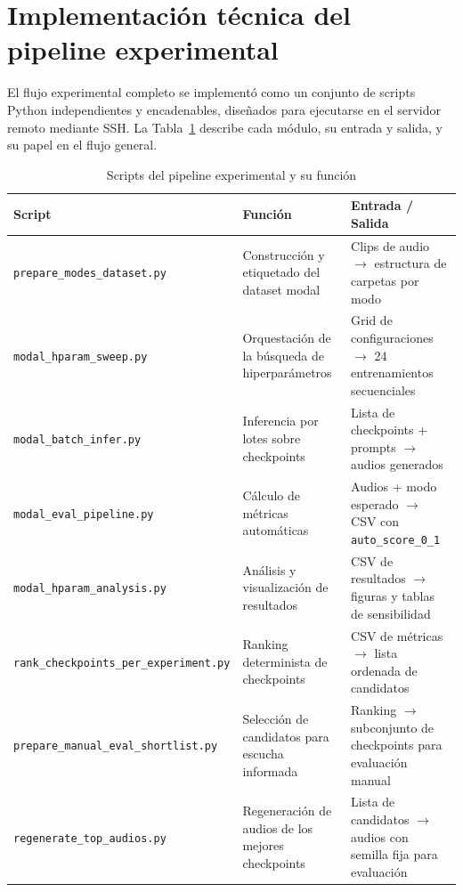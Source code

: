 \documentclass[%
    school=etsisi,%
    type=pfg,%
    degree=61CD,%
]{upm-report}
\begin{document}
\section{Implementaci\'on t\'ecnica del pipeline experimental}
\label{s:implementacion-pipeline}

El flujo experimental completo se implement\'o como un conjunto de scripts Python independientes y encadenables, dise\~nados para ejecutarse en el servidor remoto mediante SSH. La Tabla~\ref{tab:scripts-pipeline} describe cada m\'odulo, su entrada y salida, y su papel en el flujo general.

\begin{table}[H]
    \centering
    \caption{Scripts del pipeline experimental y su funci\'on}
    \label{tab:scripts-pipeline}
    \small
    \begin{tabular}{p{5.2cm}p{3.3cm}p{4.5cm}}
        \toprule
        \textbf{Script} & \textbf{Funci\'on} & \textbf{Entrada / Salida} \\
        \midrule
        \texttt{prepare\_modes\_dataset.py}
            & Construcci\'on y etiquetado del dataset modal
            & Clips de audio $\to$ estructura de carpetas por modo \\
        \texttt{modal\_hparam\_sweep.py}
            & Orquestaci\'on de la b\'usqueda de hiperpar\'ametros
            & Grid de configuraciones $\to$ 24 entrenamientos secuenciales \\
        \texttt{modal\_batch\_infer.py}
            & Inferencia por lotes sobre checkpoints
            & Lista de checkpoints + prompts $\to$ audios generados \\
        \texttt{modal\_eval\_pipeline.py}
            & C\'alculo de m\'etricas autom\'aticas
            & Audios + modo esperado $\to$ CSV con \texttt{auto\_score\_0\_1} \\
        \texttt{modal\_hparam\_analysis.py}
            & An\'alisis y visualizaci\'on de resultados
            & CSV de resultados $\to$ figuras y tablas de sensibilidad \\
        \texttt{rank\_checkpoints\_per\_}\newline\texttt{experiment.py}
            & Ranking determinista de checkpoints
            & CSV de m\'etricas $\to$ lista ordenada de candidatos \\
        \texttt{prepare\_manual\_eval\_}\newline\texttt{shortlist.py}
            & Selecci\'on de candidatos para escucha informada
            & Ranking $\to$ subconjunto de checkpoints para evaluaci\'on manual \\
        \texttt{regenerate\_top\_audios.py}
            & Regeneraci\'on de audios de los mejores checkpoints
            & Lista de candidatos $\to$ audios con semilla fija para evaluaci\'on \\
        \bottomrule
    \end{tabular}
\end{table}
\end{document}
